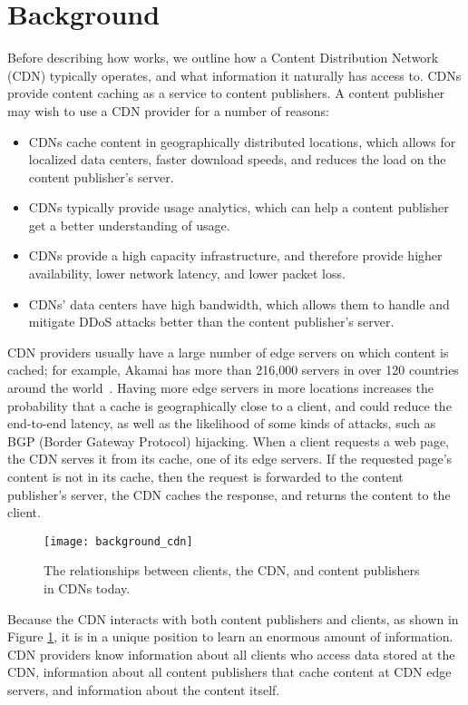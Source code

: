 \section{Background}
\label{sec:background}
Before describing how \system{} works, we outline how a Content Distribution Network (CDN) typically operates, and what information 
it naturally has access to.  CDNs provide content caching as a service to content publishers.  A 
content publisher may wish to use a CDN provider for a number of reasons:

\begin{itemize}
\item CDNs cache content in geographically distributed locations, which allows for localized 
data centers, faster download speeds, and reduces the load on the content publisher's server.
\item CDNs typically provide usage analytics, which can help a content publisher get a better 
understanding of usage.
\item CDNs provide a high capacity infrastructure, and therefore provide higher availability, 
lower network latency, and lower packet loss.  
\item CDNs' data centers have high bandwidth, which allows them to handle and mitigate DDoS attacks better 
than the content publisher's server.
\end{itemize}

CDN providers usually have a large number of edge servers on which content is cached; for example, 
Akamai has more than 216,000 servers in over 120 countries around the world~\cite{akamai_facts}.  
Having more edge servers in more locations increases the probability that a cache is geographically 
close to a client, and could reduce the end-to-end latency, as well as the likelihood of some kinds of 
attacks, such as BGP (Border Gateway Protocol) hijacking.  When a client requests a web page, 
the CDN serves it from its cache, one of its edge servers.  If the requested page's content is 
not in its cache, then the request is forwarded to the content publisher's server, the CDN 
caches the response, and returns the content to the client. 

\begin{figure}[t]
\centering
\texttt{[image: background\_cdn]}
\caption{The relationships between clients, the CDN, and content publishers in 
CDNs today.}
\label{fig:basic_cdn}
\end{figure}

Because the CDN interacts with both content publishers and clients, as shown in Figure \ref{fig:basic_cdn}, it is in a unique position 
to learn an enormous amount of information.  CDN providers know information about all clients who
access data stored at the CDN, information about all content publishers that cache content at 
CDN edge servers, and information about the content itself.

